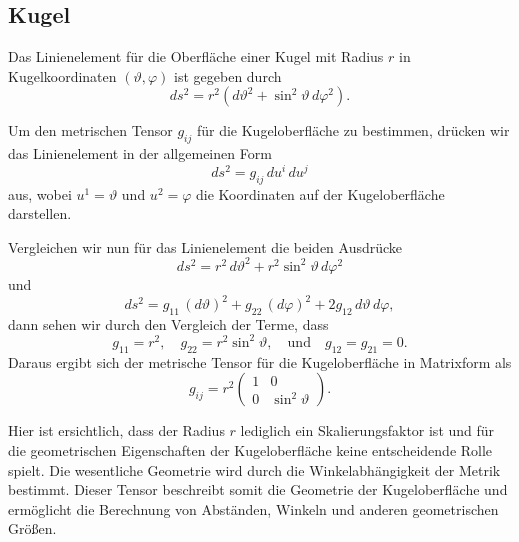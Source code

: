 %
%
%
%
\subsection{Kugel\label{geodaeten:section:MetrischerTensor:Kugel}}

Das Linienelement für die Oberfläche einer Kugel mit Radius $r$ in Kugelkoordinaten $(\vartheta, \varphi)$ ist gegeben durch
\begin{equation}
	ds^2 = r^2 \left( d\vartheta^2 + \sin^2\vartheta \, d\varphi^2 \right).
\end{equation}

Um den metrischen Tensor $g_{i\!j}$ für die Kugeloberfläche zu bestimmen, drücken wir das Linienelement in der allgemeinen Form
\begin{equation}
	ds^2 = g_{i\!j} \, du^i \, du^j
\end{equation}
aus, wobei $u^1 = \vartheta$ und $u^2 = \varphi$ die Koordinaten auf der Kugeloberfläche darstellen.

Vergleichen wir nun für das Linienelement die beiden Ausdrücke 
\begin{equation}
	ds^2 = r^2 \, d\vartheta^2 + r^2 \sin^2\vartheta \, d\varphi^2
\end{equation}
und
\begin{equation}
	ds^2 = g_{11} \, (d\vartheta)^2 + g_{22} \, (d\varphi)^2 + 2g_{12} \, d\vartheta \, d\varphi,
\end{equation}
dann sehen wir durch den Vergleich der Terme, dass
\begin{equation}
	g_{11} = r^2, \quad g_{22} = r^2 \sin^2\vartheta, \quad \text{und} \quad g_{12} = g_{21} = 0.
\end{equation}
Daraus ergibt sich der metrische Tensor für die Kugeloberfläche in Matrixform als
\begin{equation}
	g_{i\!j} = r^2 \begin{pmatrix}
		1 & 0 \\
		0 & \sin^2\vartheta
	\end{pmatrix}.
\end{equation}

Hier ist ersichtlich, dass der Radius $r$ lediglich ein Skalierungsfaktor ist und für die geometrischen Eigenschaften der Kugeloberfläche keine entscheidende Rolle spielt. 
Die wesentliche Geometrie wird durch die Winkelabhängigkeit der Metrik bestimmt.
Dieser Tensor beschreibt somit die Geometrie der Kugeloberfläche und ermöglicht die Berechnung von Abständen, Winkeln und anderen geometrischen Größen.
